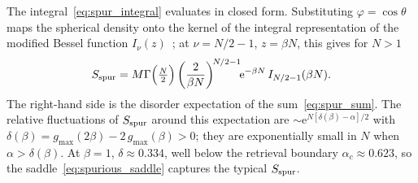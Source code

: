 \documentclass[letterpaper]{article} %
\newcommand{\e}{{\mathrm{e}}}
\newcommand{\Bnet}{\beta}
\begin{document}
The integral~\eqref{eq:spur_integral} evaluates in closed form. Substituting
$\varphi = \cos\theta$ maps the spherical density onto the kernel of the integral
representation of the modified Bessel function
$I_\nu(z)$~\citep[8.431.3]{gradshteyn2015}; at $\nu = N/2 - 1$, $z = \Bnet N$,
this gives for $N > 1$
\begin{equation}
S_{\rm spur} = M \Gamma\Big(\tfrac{N}{2}\Big)\left(\frac{2}{\Bnet N}\right)^{\!N/2-1}\!\!\e^{-\Bnet N}\,I_{N/2-1}(\Bnet N).
\label{eq:spurious_exact}
\end{equation}
The right-hand side is the disorder expectation of the sum~\eqref{eq:spur_sum}. The
relative fluctuations of $S_{\rm spur}$ around this expectation are
$\sim \e^{N[\delta(\Bnet) - \alpha]/2}$ with
$\delta(\Bnet) = g_{\max}(2\Bnet) - 2\,g_{\max}(\Bnet) > 0$; they are exponentially
small in $N$ when $\alpha > \delta(\Bnet)$. At $\Bnet = 1$, $\delta \approx 0.334$,
well below the retrieval boundary $\alpha_c \approx 0.623$, so the
saddle~\eqref{eq:spurious_saddle} captures the typical $S_{\rm spur}$.
\end{document}
